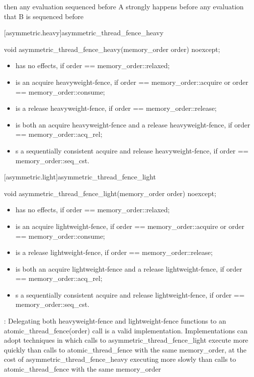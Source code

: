 then any evaluation sequenced before A strongly happens before any evaluation that B is
sequenced before


[asymmetric.heavy]{asymmetric_thread_fence_heavy}
\begin{itemdecl}
void asymmetric_thread_fence_heavy(memory_order order) noexcept;
\end{itemdecl}

\begin{itemdescr}


\pnum
\effects
\begin{itemize}
    \item  has no effects, if order == memory\_order::relaxed;
\item  is an acquire heavyweight-fence, if order == memory\_order::acquire or order ==
memory\_order::consume;
\item is a release heavyweight-fence, if order == memory\_order::release;
\item is both an acquire heavyweight-fence and a release heavyweight-fence, if order ==
memory\_order::acq\_rel;
\item s a sequentially consistent acquire and release heavyweight-fence, if order ==
memory\_order::seq\_cst.
\end{itemize}

\end{itemdescr}

[asymmetric.light]{asymmetric_thread_fence_light}
\begin{itemdecl}
void asymmetric_thread_fence_light(memory_order order) noexcept;
\end{itemdecl}

\begin{itemdescr}


\pnum
\effects
\begin{itemize}
    \item  has no effects, if order == memory\_order::relaxed;
\item  is an acquire lightweight-fence, if order == memory\_order::acquire or order ==
memory\_order::consume;
\item is a release lightweight-fence, if order == memory\_order::release;
\item is both an acquire lightweight-fence and a release lightweight-fence, if order ==
memory\_order::acq\_rel;
\item s a sequentially consistent acquire and release lightweight-fence, if order ==
memory\_order::seq\_cst.
\end{itemize}

\end{itemdescr}



\begin{note} : Delegating both heavyweight-fence and lightweight-fence functions to an
atomic_thread_fence(order) call is a valid implementation. Implementations can adopt
techniques in which calls to asymmetric_thread_fence_light execute more quickly than calls
to atomic_thread_fence with the same memory_order, at the cost of
asymmetric_thread_fence_heavy executing more slowly than calls to
atomic_thread_fence with the same memory_order
\end{note}  


